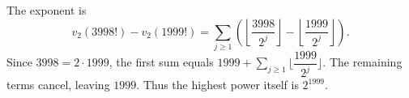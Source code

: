 The exponent is
\[
v_2(3998!)-v_2(1999!)
=\sum_{j\ge1}\left(\left\lfloor\dfrac{3998}{2^j}\right\rfloor-\left\lfloor\dfrac{1999}{2^j}\right\rfloor\right).
\]
Since $3998=2\cdot1999$, the first sum equals $1999+\sum_{j\ge1}\lfloor\dfrac{1999}{2^j}\rfloor$. The remaining terms cancel, leaving $\boxed{1999}$. Thus the highest power itself is $2^{1999}$.
